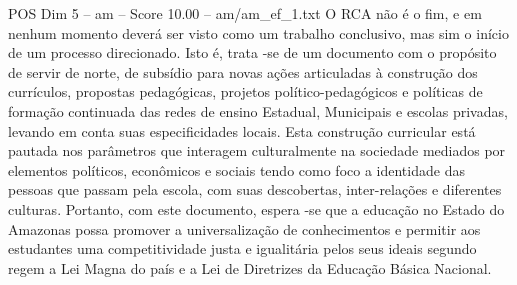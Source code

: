 \begin{textsample}{POS Dim 5 – am – Score 10.00 – am/am\_ef\_1.txt}
O RCA não é o fim, e em nenhum momento deverá ser visto como um trabalho conclusivo, mas sim o início de um processo direcionado.
Isto é, trata -se de um documento com o propósito de servir de norte, de subsídio para novas ações articuladas à construção dos currículos, propostas pedagógicas, projetos político-pedagógicos e políticas de formação continuada das redes de ensino Estadual, Municipais e escolas privadas, levando em conta suas especificidades locais.
Esta construção curricular está pautada nos parâmetros que interagem culturalmente na sociedade mediados por elementos políticos, econômicos e sociais tendo como foco a identidade das pessoas que passam pela escola, com suas descobertas, inter-relações e diferentes culturas.
Portanto, com este documento, espera -se que a educação no Estado do Amazonas possa promover a universalização de conhecimentos e permitir aos estudantes uma competitividade justa e igualitária pelos seus ideais segundo regem a Lei Magna do país e a Lei de Diretrizes da Educação Básica Nacional.

\end{textsample}
